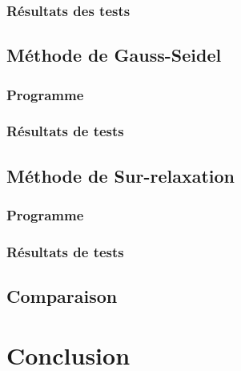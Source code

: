 \documentclass{report}
\begin{document}
      \subsection{Résultats des tests}
  	\newpage
  	\section{Méthode de Gauss-Seidel}
  	  \subsection{Programme}
        
      \newpage
      \subsection{Résultats de tests}
  	\newpage
  	\section{Méthode de Sur-relaxation}
  	  \subsection{Programme}
        
      \newpage
      \subsection{Résultats de tests}
     \newpage
     \section{Comparaison}
  \chapter*{Conclusion}
  
\end{document}
